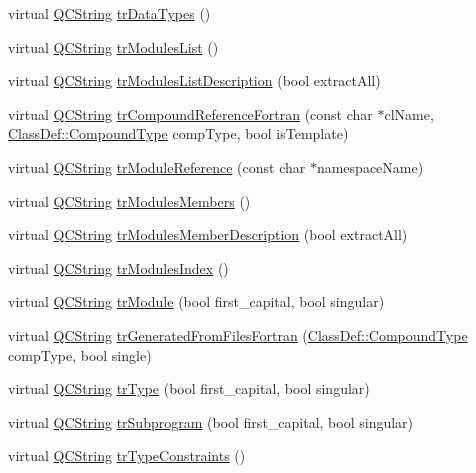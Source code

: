 \begin{DoxyCompactItemize}
\item 
virtual \mbox{\hyperlink{class_q_c_string}{Q\+C\+String}} \mbox{\hyperlink{class_translator_macedonian_acc5a393e1abb3dfcc5ff2d11b357c585}{tr\+Data\+Types}} ()
\item 
virtual \mbox{\hyperlink{class_q_c_string}{Q\+C\+String}} \mbox{\hyperlink{class_translator_macedonian_a7ba6ccaadaf2451e97c30e4cf1f9fe22}{tr\+Modules\+List}} ()
\item 
virtual \mbox{\hyperlink{class_q_c_string}{Q\+C\+String}} \mbox{\hyperlink{class_translator_macedonian_acc0fc8935f235a8c96e1bc7cd6d83e94}{tr\+Modules\+List\+Description}} (bool extract\+All)
\item 
virtual \mbox{\hyperlink{class_q_c_string}{Q\+C\+String}} \mbox{\hyperlink{class_translator_macedonian_a9af65190c5529cb48b130d1c57ac79e0}{tr\+Compound\+Reference\+Fortran}} (const char $\ast$cl\+Name, \mbox{\hyperlink{class_class_def_ae70cf86d35fe954a94c566fbcfc87939}{Class\+Def\+::\+Compound\+Type}} comp\+Type, bool is\+Template)
\item 
virtual \mbox{\hyperlink{class_q_c_string}{Q\+C\+String}} \mbox{\hyperlink{class_translator_macedonian_a5a6950225b0ca175a9769651a30f6c88}{tr\+Module\+Reference}} (const char $\ast$namespace\+Name)
\item 
virtual \mbox{\hyperlink{class_q_c_string}{Q\+C\+String}} \mbox{\hyperlink{class_translator_macedonian_ac031601f60e865efd155821db72aa8cf}{tr\+Modules\+Members}} ()
\item 
virtual \mbox{\hyperlink{class_q_c_string}{Q\+C\+String}} \mbox{\hyperlink{class_translator_macedonian_a1152de047c797cd809be845051d8b1cb}{tr\+Modules\+Member\+Description}} (bool extract\+All)
\item 
virtual \mbox{\hyperlink{class_q_c_string}{Q\+C\+String}} \mbox{\hyperlink{class_translator_macedonian_a0ad71c5feeeb8481c6cc35dccb65bfa4}{tr\+Modules\+Index}} ()
\item 
virtual \mbox{\hyperlink{class_q_c_string}{Q\+C\+String}} \mbox{\hyperlink{class_translator_macedonian_ab96b77af3f361c0ec706e596ef0e6638}{tr\+Module}} (bool first\+\_\+capital, bool singular)
\item 
virtual \mbox{\hyperlink{class_q_c_string}{Q\+C\+String}} \mbox{\hyperlink{class_translator_macedonian_a07310449a1bce631676f9afd786babc5}{tr\+Generated\+From\+Files\+Fortran}} (\mbox{\hyperlink{class_class_def_ae70cf86d35fe954a94c566fbcfc87939}{Class\+Def\+::\+Compound\+Type}} comp\+Type, bool single)
\item 
virtual \mbox{\hyperlink{class_q_c_string}{Q\+C\+String}} \mbox{\hyperlink{class_translator_macedonian_af2309784cdb6562af2f328a5d9b7f76f}{tr\+Type}} (bool first\+\_\+capital, bool singular)
\item 
virtual \mbox{\hyperlink{class_q_c_string}{Q\+C\+String}} \mbox{\hyperlink{class_translator_macedonian_a50fa65b1f21b134f9075f324d87df626}{tr\+Subprogram}} (bool first\+\_\+capital, bool singular)
\item 
virtual \mbox{\hyperlink{class_q_c_string}{Q\+C\+String}} \mbox{\hyperlink{class_translator_macedonian_ac0220d75809fff7ddb641ce52f9e2253}{tr\+Type\+Constraints}} ()
\end{DoxyCompactItemize}

